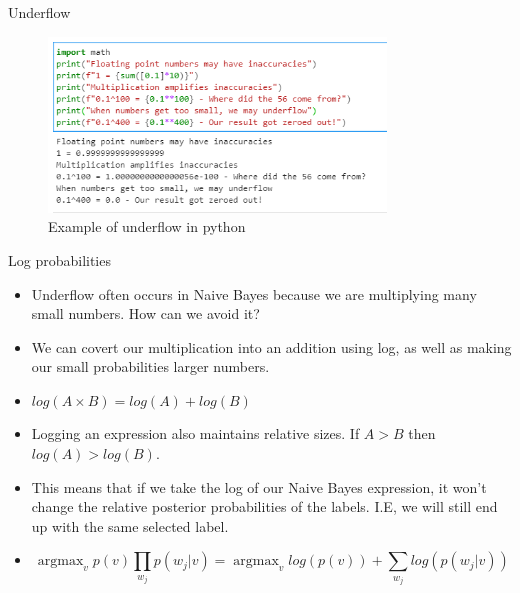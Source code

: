 \documentclass[aspectratio=169, 10pt]{beamer}
\DeclareMathOperator*{\argmax}{argmax}
\begin{document}
\begin{frame}{Underflow}
\begin{figure}
    \centering
    \includegraphics[width=0.8\textwidth]{../imgs/underflow.png}
    \caption{Example of underflow in python}
\end{figure}
\end{frame}
    
\begin{frame}{Log probabilities}
\begin{itemize}
    \item Underflow often occurs in Naive Bayes because we are multiplying many small numbers. How can we avoid it?
    \item We can covert our multiplication into an addition using log, as well as making our small probabilities larger numbers.
    \item $log(A\times B) = log(A) + log(B)$
    \item Logging an expression also maintains relative sizes. If $A > B$ then $log(A) > log(B)$.
    \item This means that if we take the log of our Naive Bayes expression, it won't change the relative posterior probabilities of the labels. I.E, we will still end up with the same selected label.
    \item $$\argmax_{v} p(v)\prod_{w_j}p(w_j|v) = \argmax_{v} log(p(v)) + \sum_{w_j}log(p(w_j|v))$$
\end{itemize}
\end{frame}
\end{document}
